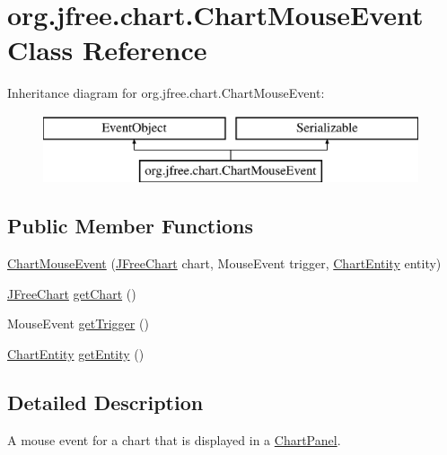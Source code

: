 \hypertarget{classorg_1_1jfree_1_1chart_1_1_chart_mouse_event}{}\section{org.\+jfree.\+chart.\+Chart\+Mouse\+Event Class Reference}
\label{classorg_1_1jfree_1_1chart_1_1_chart_mouse_event}
Inheritance diagram for org.\+jfree.\+chart.\+Chart\+Mouse\+Event\+:\begin{figure}[H]
\begin{center}
\leavevmode
\includegraphics[height=2.000000cm]{classorg_1_1jfree_1_1chart_1_1_chart_mouse_event}
\end{center}
\end{figure}
\subsection*{Public Member Functions}
\begin{DoxyCompactItemize}
\item 
\mbox{\hyperlink{classorg_1_1jfree_1_1chart_1_1_chart_mouse_event_a71660f7001d76ffcee9e9909ffde22ef}{Chart\+Mouse\+Event}} (\mbox{\hyperlink{classorg_1_1jfree_1_1chart_1_1_j_free_chart}{J\+Free\+Chart}} chart, Mouse\+Event trigger, \mbox{\hyperlink{classorg_1_1jfree_1_1chart_1_1entity_1_1_chart_entity}{Chart\+Entity}} entity)
\item 
\mbox{\hyperlink{classorg_1_1jfree_1_1chart_1_1_j_free_chart}{J\+Free\+Chart}} \mbox{\hyperlink{classorg_1_1jfree_1_1chart_1_1_chart_mouse_event_a55af608f4357699d9b4aa659e6ce3220}{get\+Chart}} ()
\item 
Mouse\+Event \mbox{\hyperlink{classorg_1_1jfree_1_1chart_1_1_chart_mouse_event_a99122c07588d5b627b887a7ec6014815}{get\+Trigger}} ()
\item 
\mbox{\hyperlink{classorg_1_1jfree_1_1chart_1_1entity_1_1_chart_entity}{Chart\+Entity}} \mbox{\hyperlink{classorg_1_1jfree_1_1chart_1_1_chart_mouse_event_a42d0006c4a10790cc955667c2c0b60ac}{get\+Entity}} ()
\end{DoxyCompactItemize}


\subsection{Detailed Description}
A mouse event for a chart that is displayed in a \mbox{\hyperlink{classorg_1_1jfree_1_1chart_1_1_chart_panel}{Chart\+Panel}}.


